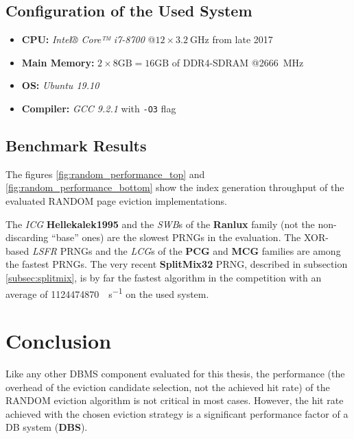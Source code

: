 \subsection[System Configuration]{Configuration of the Used System}

\begin{@empty}
    \begin{itemize}
        \itemsep0em
		\item	\textbf{CPU:} \emph{Intel® Core™ i7-8700} @$12 \times \SI{3.2}{\giga\hertz}$ from late 2017
        \item	\textbf{Main Memory:} $2 \times 8\text{GB} = 16\text{GB}$ of DDR4-SDRAM @\SI{2666}{\mega\hertz}
        \item	\textbf{OS:} \emph{Ubuntu 19.10}
        \item	\textbf{Compiler: } \emph{GCC 9.2.1} with \texttt{-O3} flag
    \end{itemize}
\end{@empty}

\subsection[Benchmark Results]{Benchmark Results}

    The figures \ref{fig:random_performance_top} and \ref{fig:random_performance_bottom} show the index generation throughput of the evaluated RANDOM page eviction implementations.

    The \emph{ICG} \textbf{Hellekalek1995} and the \emph{SWB}s of the \textbf{Ranlux} family (not the non-discarding ``base'' ones) are the slowest PRNGs in the evaluation. The XOR-based \emph{LSFR} PRNGs and the \emph{LCG}s of the \textbf{PCG} and \textbf{MCG} families are among the fastest PRNGs. The very recent \textbf{SplitMix32} PRNG, described in subsection \ref{subsec:splitmix}, is by far the fastest algorithm in the competition with an average of \SI{1124474870}{\indexes\per\second} on the used system.

\section{Conclusion}

    Like any other DBMS component evaluated for this thesis, the performance (the overhead of the eviction candidate selection, not the achieved hit rate) of the RANDOM eviction algorithm is not critical in most cases. However, the hit rate achieved with the chosen eviction strategy is a significant performance factor of a DB system (\textbf{DBS}).

